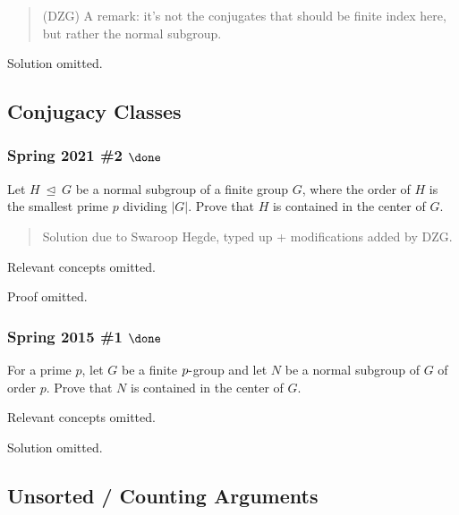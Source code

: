 \begin{quote}
(DZG) A remark: it's not the conjugates that should be finite index
here, but rather the normal subgroup.
\end{quote}

Solution omitted.

\hypertarget{conjugacy-classes}{%
\subsection{Conjugacy Classes}\label{conjugacy-classes}}

\hypertarget{spring-2021-2-done}{%
\subsubsection{\texorpdfstring{Spring 2021 \#2
\(\done\)}{Spring 2021 \#2 \textbackslash done}}\label{spring-2021-2-done}}

Let \(H {~\trianglelefteq~}G\) be a normal subgroup of a finite group
\(G\), where the order of \(H\) is the smallest prime \(p\) dividing
\({\left\lvert {G} \right\rvert}\). Prove that \(H\) is contained in the
center of \(G\).

\begin{quote}
Solution due to Swaroop Hegde, typed up + modifications added by DZG.
\end{quote}

Relevant concepts omitted.

Proof omitted.

\hypertarget{spring-2015-1-done}{%
\subsubsection{\texorpdfstring{Spring 2015 \#1
\(\done\)}{Spring 2015 \#1 \textbackslash done}}\label{spring-2015-1-done}}

For a prime \(p\), let \(G\) be a finite \(p{\hbox{-}}\)group and let
\(N\) be a normal subgroup of \(G\) of order \(p\). Prove that \(N\) is
contained in the center of \(G\).

Relevant concepts omitted.

Solution omitted.

\hypertarget{unsorted-counting-arguments}{%
\subsection{Unsorted / Counting
Arguments}\label{unsorted-counting-arguments}}

